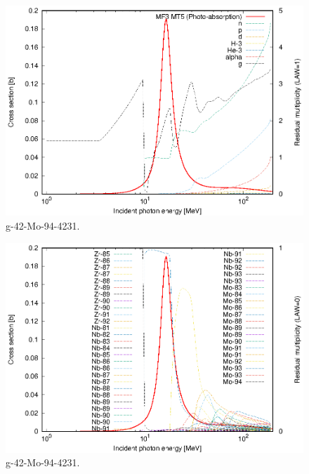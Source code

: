 \begin{figure}
 \includegraphics[width=\linewidth]{eps/g_42-Mo-94_4231.eps}
  \caption{g-42-Mo-94-4231.}
\end{figure}
\begin{figure}
 \includegraphics[width=\linewidth]{eps-law0/g_42-Mo-94_4231.eps}
 \caption{g-42-Mo-94-4231.}
\end{figure}
\newpage \clearpage

